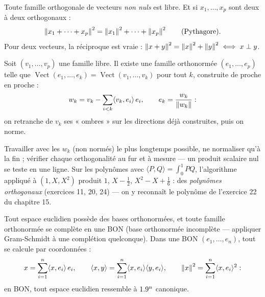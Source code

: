 \begin{theoreme}
Toute famille orthogonale de vecteurs \emph{non nuls} est libre. Et si
$x_1,\dots,x_p$ sont deux à deux orthogonaux :
\[
\left\lVert x_1+\dots+x_p\right\rVert^{2}=\left\lVert x_1\right\rVert^{2}+\dots+\left\lVert x_p\right\rVert^{2}
\qquad\text{(Pythagore).}
\]
Pour deux vecteurs, la réciproque est vraie :
$\left\lVert x+y\right\rVert^{2}=\left\lVert x\right\rVert^{2}+\left\lVert y\right\rVert^{2}\iff x\perp y$.
\end{theoreme}


\begin{theoreme}[Orthonormalisation]
Soit $(v_1,\dots,v_p)$ une famille libre. Il existe une famille
orthonormée $(e_1,\dots,e_p)$ telle que
$\operatorname{Vect}(e_1,\dots,e_k)=\operatorname{Vect}(v_1,\dots,v_k)$
pour tout $k$, construite de proche en proche :
\[
w_k=v_k-\sum_{i<k}\langle v_k,e_i\rangle\,e_i ,
\qquad
e_k=\frac{w_k}{\left\lVert w_k\right\rVert} :
\]
on retranche de $v_k$ ses « ombres » sur les directions déjà construites,
puis on norme.
\end{theoreme}

\begin{savoirfaire}
Travailler avec les $w_k$ (non normés) le plus longtemps possible, ne
normaliser qu'à la fin ; vérifier chaque orthogonalité au fur et à mesure
— un produit scalaire nul se teste en une ligne. Sur les polynômes avec
$\langle P,Q\rangle=\int_0^1PQ$, l'algorithme appliqué à $(1,X,X^{2})$
produit $1$, $X-\frac12$, $X^{2}-X+\frac16$ : des \emph{polynômes
orthogonaux} (exercices 11, 20, 24) — on y reconnaît le polynôme de
l'exercice 22 du chapitre 15.
\end{savoirfaire}


\begin{theoreme}
Tout espace euclidien possède des bases orthonormées, et toute famille
orthonormée se complète en une BON (base orthonormée incomplète —
appliquer Gram-Schmidt à une complétion quelconque). Dans une BON
$(e_1,\dots,e_n)$, tout se calcule par coordonnées :
\[
x=\sum_{i=1}^{n}\langle x,e_i\rangle\,e_i ,
\qquad
\langle x,y\rangle=\sum_{i=1}^{n}\langle x,e_i\rangle\langle y,e_i\rangle ,
\qquad
\left\lVert x\right\rVert^{2}=\sum_{i=1}^{n}\langle x,e_i\rangle^{2} :
\]
en BON, tout espace euclidien ressemble à $1.9^{n}$ canonique.
\end{theoreme}


